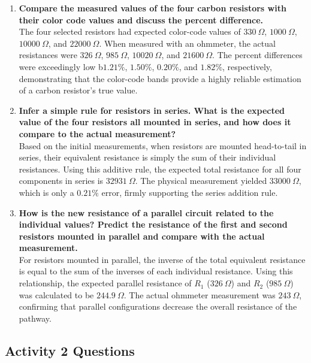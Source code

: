 \documentclass[12pt]{article}
\begin{document}
\begin{enumerate}
  \item \textbf{Compare the measured values of the four carbon resistors with
        their color code values and discuss the percent difference.} \\
        The four selected resistors had expected color-code values
        of $330~\Omega$, $1000~\Omega$, $10000~\Omega$, and $22000~\Omega$. When
        measured with an ohmmeter, the actual resistances
        were $326~\Omega$, $985~\Omega$, $10020~\Omega$, and $21600~\Omega$. The
        percent differences were exceedingly low b$1.21\%$, $1.50\%$, $0.20\%$,
        and $1.82\%$, respectively, demonstrating that the color-code bands
        provide a highly reliable estimation of a carbon resistor's true value.

  \item \textbf{Infer a simple rule for resistors in series. What is the
        expected value of the four resistors all mounted in series, and how does
        it compare to the actual measurement?} \\
        Based on the initial measurements, when resistors are mounted
        head-to-tail in series, their equivalent resistance is simply the sum of
        their individual resistances. Using this additive rule, the expected
        total resistance for all four components in series is $32931~\Omega$.
        The physical measurement yielded $33000~\Omega$, which is only
        a $0.21\%$ error, firmly supporting the series addition rule.

  \item \textbf{How is the new resistance of a parallel circuit related to the
        individual values? Predict the resistance of the first and second
        resistors mounted in parallel and compare with the actual measurement.}
        \\
        For resistors mounted in parallel, the inverse of the total equivalent
        resistance is equal to the sum of the inverses of each individual
        resistance. Using this relationship, the expected parallel resistance
        of $R_1$ ($326~\Omega$) and $R_2$ ($985~\Omega$) was calculated to
        be $244.9~\Omega$. The actual ohmmeter measurement was $243~\Omega$,
        confirming that parallel configurations decrease the overall resistance
        of the pathway.

\end{enumerate}

\subsection*{Activity 2 Questions}
\end{document}
